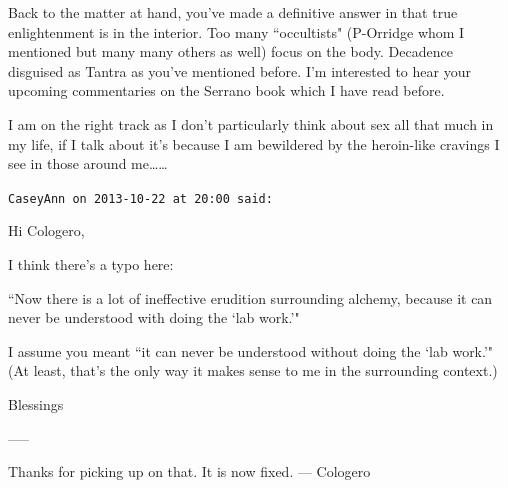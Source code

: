 \begin{footnotesize}
\begin{sffamily}
Back to the matter at hand, you've made a definitive answer in that true enlightenment is in the interior. Too many ``occultists" (P-Orridge whom I mentioned but many many others as well) focus on the body. Decadence disguised as Tantra as you've mentioned before. I'm interested to hear your upcoming commentaries on the Serrano book which I have read before. 

I am on the right track as I don't particularly think about sex all that much in my life, if I talk about it's because I am bewildered by the heroin-like cravings I see in those around me……


\hfill

\texttt{CaseyAnn on 2013-10-22 at 20:00 said: }

Hi Cologero,

I think there's a typo here:

``Now there is a lot of ineffective erudition surrounding alchemy, because it can never be understood with doing the `lab work.'"

I assume you meant ``it can never be understood without doing the `lab work.'" (At least, that's the only way it makes sense to me in the surrounding context.)

Blessings

—–

Thanks for picking up on that. It is now fixed. — Cologero


\end{sffamily}\end{footnotesize}
